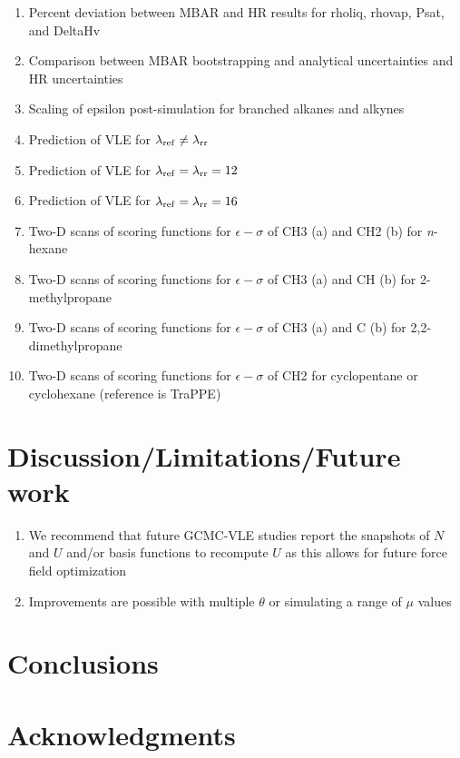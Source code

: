 \documentclass[11pt,a4paper]{article}
\begin{document}
\begin{enumerate}
	\item Percent deviation between MBAR and HR results for rholiq, rhovap, Psat, and DeltaHv
	\item Comparison between MBAR bootstrapping and analytical uncertainties and HR uncertainties
	\item Scaling of epsilon post-simulation for branched alkanes and alkynes
	\item Prediction of VLE for $\lambda_{\rm ref} \neq \lambda_{\rm rr}$
	\item Prediction of VLE for $\lambda_{\rm ref} = \lambda_{\rm rr} = 12$
    \item Prediction of VLE for $\lambda_{\rm ref} = \lambda_{\rm rr} = 16$
	\item Two-D scans of scoring functions for $\epsilon-\sigma$ of CH3 (a) and CH2 (b) for \textit{n}-hexane
	\item Two-D scans of scoring functions for $\epsilon-\sigma$ of CH3 (a) and CH (b) for 2-methylpropane
	\item Two-D scans of scoring functions for $\epsilon-\sigma$ of CH3 (a) and C (b) for 2,2-dimethylpropane
	\item Two-D scans of scoring functions for $\epsilon-\sigma$ of CH2 for cyclopentane or cyclohexane (reference is TraPPE)
\end{enumerate}

\section{Discussion/Limitations/Future work}

\begin{enumerate}
	\item We recommend that future GCMC-VLE studies report the snapshots of $N$ and $U$ and/or basis functions to recompute $U$ as this allows for future force field optimization
	\item Improvements are possible with multiple $\theta$ or simulating a range of $\mu$ values
\end{enumerate}

\section{Conclusions}

\section{Acknowledgments}
\end{document}
